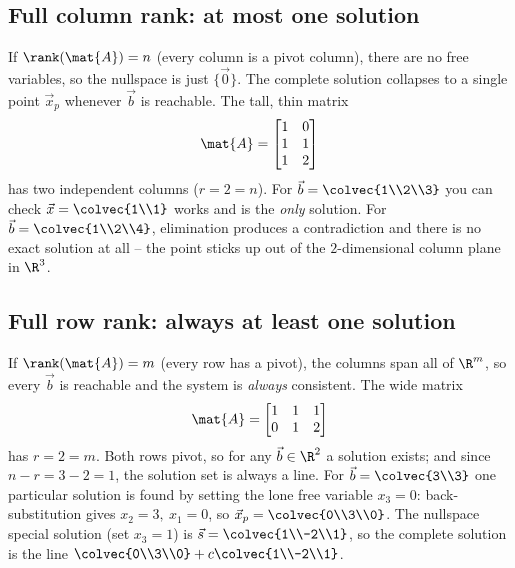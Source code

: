 \subsection{Full column rank: at most one solution}

If $\rank(\mat{A})=n$ (every column is a pivot column), there are no free variables, so the
nullspace is just $\{\vec{0}\}$. The complete solution collapses to a single point
$\vec{x}_p$ whenever $\vec{b}$ is reachable. The tall, thin matrix
\[
  \mat{A}=\begin{bmatrix}1&0\\1&1\\1&2\end{bmatrix}
\]
has two independent columns ($r=2=n$). For $\vec{b}=\colvec{1\\2\\3}$ you can check
$\vec{x}=\colvec{1\\1}$ works and is the \emph{only} solution. For
$\vec{b}=\colvec{1\\2\\4}$, elimination produces a contradiction and there is no exact
solution at all -- the point sticks up out of the $2$-dimensional column plane in $\R^3$.

\subsection{Full row rank: always at least one solution}

If $\rank(\mat{A})=m$ (every row has a pivot), the columns span all of $\R^m$, so every
$\vec{b}$ is reachable and the system is \emph{always} consistent. The wide matrix
\[
  \mat{A}=\begin{bmatrix}1&1&1\\0&1&2\end{bmatrix}
\]
has $r=2=m$. Both rows pivot, so for any $\vec b\in\R^2$ a solution exists; and since
$n-r=3-2=1$, the solution set is always a line. For $\vec b=\colvec{3\\3}$ one particular
solution is found by setting the lone free variable $x_3=0$: back-substitution gives
$x_2=3,\ x_1=0$, so $\vec{x}_p=\colvec{0\\3\\0}$. The nullspace special solution (set
$x_3=1$) is $\vec{s}=\colvec{1\\-2\\1}$, so the complete solution is the line
$\colvec{0\\3\\0}+c\colvec{1\\-2\\1}$.

